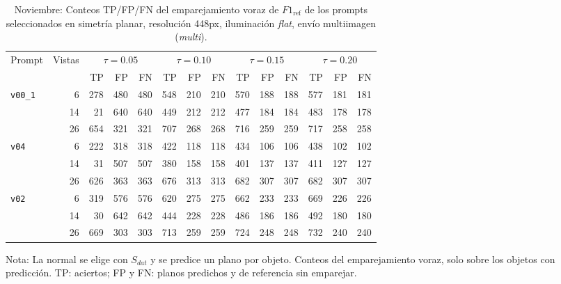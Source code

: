 \begin{table}[htbp]
\centering
\caption{Noviembre: Conteos TP/FP/FN del emparejamiento voraz de $F1_{\mathrm{ref}}$ de los prompts seleccionados en simetría planar, resolución 448px, iluminación \textit{flat}, envío multiimagen (\textit{multi}).}
\label{tab:nov_plane_448_conteos}
\begin{lrbox}{\tablebox}
\begin{adjustbox}{max width=\textwidth}
\begin{tabular}{lrrrrrrrrrrrrr}
\toprule
\multirow{2}{*}{Prompt} & \multirow{2}{*}{Vistas} & \multicolumn{3}{c}{$\tau{=}0.05$} & \multicolumn{3}{c}{$\tau{=}0.10$} & \multicolumn{3}{c}{$\tau{=}0.15$} & \multicolumn{3}{c}{$\tau{=}0.20$} \\
\cmidrule(lr){3-5} \cmidrule(lr){6-8} \cmidrule(lr){9-11} \cmidrule(lr){12-14}
 &  & TP & FP & FN & TP & FP & FN & TP & FP & FN & TP & FP & FN \\
\midrule
\multirow{3}{*}{\texttt{v00\_1}} & 6 & 278 & 480 & 480 & 548 & 210 & 210 & 570 & 188 & 188 & 577 & 181 & 181 \\
 & 14 & 21 & 640 & 640 & 449 & 212 & 212 & 477 & 184 & 184 & 483 & 178 & 178 \\
 & 26 & 654 & 321 & 321 & 707 & 268 & 268 & 716 & 259 & 259 & 717 & 258 & 258 \\
\midrule
\multirow{3}{*}{\texttt{v04}} & 6 & 222 & 318 & 318 & 422 & 118 & 118 & 434 & 106 & 106 & 438 & 102 & 102 \\
 & 14 & 31 & 507 & 507 & 380 & 158 & 158 & 401 & 137 & 137 & 411 & 127 & 127 \\
 & 26 & 626 & 363 & 363 & 676 & 313 & 313 & 682 & 307 & 307 & 682 & 307 & 307 \\
\midrule
\multirow{3}{*}{\texttt{v02}} & 6 & 319 & 576 & 576 & 620 & 275 & 275 & 662 & 233 & 233 & 669 & 226 & 226 \\
 & 14 & 30 & 642 & 642 & 444 & 228 & 228 & 486 & 186 & 186 & 492 & 180 & 180 \\
 & 26 & 669 & 303 & 303 & 713 & 259 & 259 & 724 & 248 & 248 & 732 & 240 & 240 \\
\bottomrule
\end{tabular}
\end{adjustbox}
\end{lrbox}
\usebox{\tablebox}

\vspace{1.5ex}
\begin{minipage}{\wd\tablebox}
\footnotesize
Nota: La normal se elige con $S_{dat}$ y se predice un plano por objeto. Conteos del emparejamiento voraz, solo sobre los objetos con predicción. TP: aciertos; FP y FN: planos predichos y de referencia sin emparejar.
\end{minipage}
\end{table}

